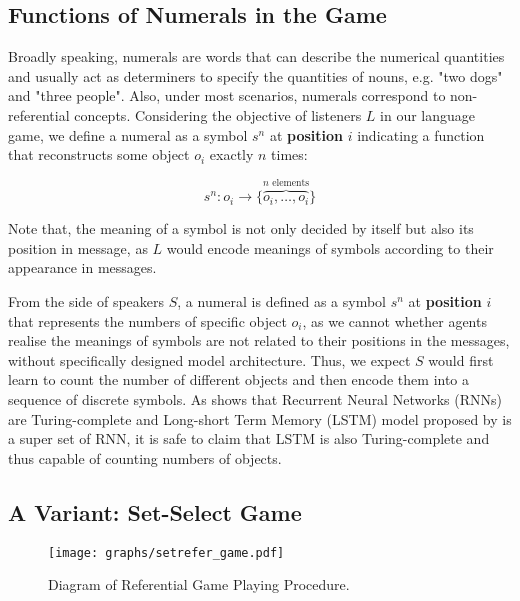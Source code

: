 \subsection{Functions of Numerals in the Game}
\label{ssec3.1.2:numeral_in_game}

Broadly speaking, numerals are words that can describe the numerical quantities and usually act as determiners to specify the quantities of nouns, e.g. "two dogs" and "three people". Also, under most scenarios, numerals correspond to non-referential concepts\cite{da2016wow}. Considering the objective of listeners $L$ in our language game, we define a numeral as a symbol $s^n$ at \textbf{position} $i$ indicating a function that reconstructs some object $o_i$ exactly $n$ times:

\begin{equation}
  s^n: o_i \rightarrow \{\overbrace{o_i, \dots, o_i}^{n \mbox{ elements}}\}
  \label{eq:3.1numeral_define}
\end{equation}

Note that, the meaning of a symbol is not only decided by itself but also its position in message, as $L$ would encode meanings of symbols according to their appearance in messages.

From the side of speakers $S$, a numeral is defined as a symbol $s^n$ at \textbf{position} $i$ that represents the numbers of specific object $o_i$, as we cannot whether agents realise the meanings of symbols are not related to their positions in the messages, without specifically designed model architecture. Thus, we expect $S$ would first learn to count the number of different objects and then encode them into a sequence of discrete symbols. As \cite{Siegelmann1992NN} shows that Recurrent Neural Networks (RNNs) are Turing-complete and Long-short Term Memory (LSTM) model proposed by \cite{hochreiter1997long} is a super set of RNN, it is safe to claim that LSTM is also Turing-complete and thus capable of counting numbers of objects.

\subsection{A Variant: Set-Select Game}
\label{ssec:3.1.3:refer_game}

\begin{figure}[!h]
  \centering
  \texttt{[image: graphs/setrefer\_game.pdf]}
  \caption{Diagram of Referential Game Playing Procedure.}
  \label{fig3:refer_game_procedure}
\end{figure}

